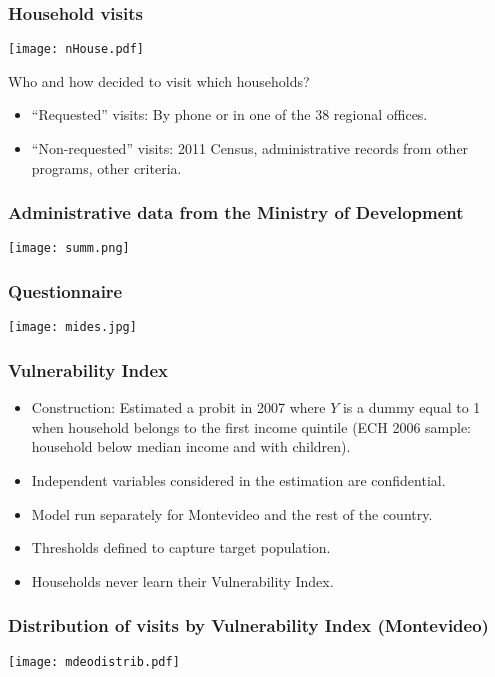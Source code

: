 \documentclass{beamer}
\begin{document}
\begin{frame}
\frametitle{Household visits}
\begin{center}
\texttt{[image: nHouse.pdf]}
\label{nHouse}
\end{center}
{\small Who and how decided to visit which households?}
\begin{itemize}
	\item {\small``Requested'' visits: By phone or in one of the 38 regional offices.}
	\item {\small``Non-requested'' visits: 2011 Census, administrative records from other programs, other criteria.}
\end{itemize}
\end{frame}

\begin{frame}
\frametitle{Administrative data from the Ministry of Development}
\begin{center}
	\texttt{[image: summ.png]}
	\label{summ}
\end{center}
\end{frame}

\begin{frame}
\frametitle{Questionnaire}
\begin{center}
\texttt{[image: mides.jpg]}
\label{mides}
\end{center}
\end{frame}

\begin{frame}
\frametitle{Vulnerability Index}
\begin{itemize}
\item Construction: Estimated a probit in 2007 where $Y$ is a dummy equal to 1 when household belongs to the first income quintile (ECH 2006 sample: household below median income and with children).
\item Independent variables considered in the estimation are confidential.
\item Model run separately for Montevideo and the rest of the country.
\item Thresholds defined to capture target population.
\item Households never learn their Vulnerability Index.	
\end{itemize}
\end{frame}

\begin{frame}
\frametitle{Distribution of visits by Vulnerability Index (Montevideo)}
\begin{center}
	\texttt{[image: mdeodistrib.pdf]}
	\label{mdeodistrib}
\end{center}
\end{frame}
\end{document}
